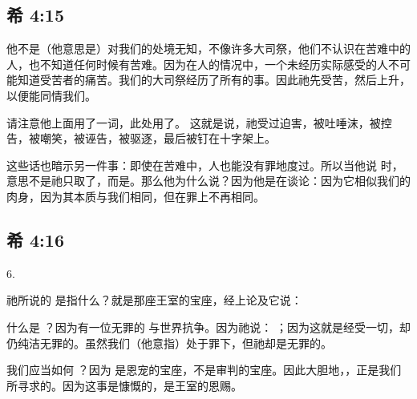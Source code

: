 \subsection{希 4:15}

他不是（他意思是）对我们的处境无知，不像许多大司祭，他们不认识在苦难中的人，也不知道任何时候有苦难。因为在人的情况中，一个未经历实际感受的人不可能知道受苦者的痛苦。我们的大司祭经历了所有的事。因此祂先受苦，然后上升，以便能同情我们。\par

请注意他上面用了一词，此处用了。 这就是说，祂受过迫害，被吐唾沫，被控告，被嘲笑，被诬告，被驱逐，最后被钉在十字架上。\par

这些话也暗示另一件事：即使在苦难中，人也能没有罪地度过。所以当他说 时，意思不是祂只取了，而是。那么他为什么说？因为他是在谈论：因为它相似我们的肉身，因为其本质与我们相同，但在罪上不再相同。\par


\subsection{希 4:16}

6. \par

祂所说的  是指什么？就是那座王室的宝座，经上论及它说： \par

什么是 ？因为有一位无罪的 与世界抗争。因为祂说： ；因为这就是经受一切，却仍纯洁无罪的。虽然我们（他意指）处于罪下，但祂却是无罪的。\par

我们应当如何 ？因为  是恩宠的宝座，不是审判的宝座。因此大胆地，，正是我们所寻求的。因为这事是慷慨的，是王室的恩赐。\par

